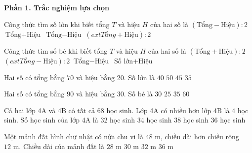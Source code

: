 \textbf{Phần 1. Trắc nghiệm lựa chọn}

\begin{ex} %
Công thức tìm số lớn khi biết tổng $T$ và hiệu $H$ của hai số là
\choice
{$(\text{Tổng} - \text{Hiệu}) : 2$}
{$\text{Tổng} + \text{Hiệu}$}
{$\text{Tổng} - \text{Hiệu}$}
{\True $(	ext{Tổng} + \text{Hiệu}) : 2$}
\end{ex}

\begin{ex} %
Công thức tìm số bé khi biết tổng $T$ và hiệu $H$ của hai số là
\choice
{$(\text{Tổng} + \text{Hiệu}) : 2$}
{\True $(	ext{Tổng} - \text{Hiệu}) : 2$}
{$\text{Tổng} - \text{Hiệu}$}
{$\text{Số lớn} + \text{Hiệu}$}
\end{ex}

\begin{ex} %
Hai số có tổng bằng $70$ và hiệu bằng $20$. Số lớn là
\choice
{$40$}
{$50$}
{\True $45$}
{$35$}
\end{ex}

\begin{ex} %
Hai số có tổng bằng $90$ và hiệu bằng $30$. Số bé là
\choice
{\True $30$}
{$25$}
{$35$}
{$60$}
\end{ex}

\begin{ex} %
Cả hai lớp 4A và 4B có tất cả $68$ học sinh. Lớp 4A có nhiều hơn lớp 4B là $4$ học sinh. Số học sinh của lớp 4A là
\choice
{$32$ học sinh}
{$34$ học sinh}
{$38$ học sinh}
{\True $36$ học sinh}
\end{ex}

\begin{ex} %
Một mảnh đất hình chữ nhật có nửa chu vi là $48\text{ m}$, chiều dài hơn chiều rộng $12\text{ m}$. Chiều dài của mảnh đất là
\choice
{$28\text{ m}$}
{\True $30\text{ m}$}
{$32\text{ m}$}
{$36\text{ m}$}
\end{ex}

